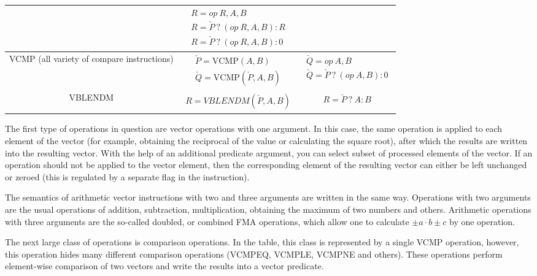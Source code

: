 \documentclass[
11pt,%
tightenlines,%
twoside,%
onecolumn,%
nofloats,%
nobibnotes,%
nofootinbib,%
superscriptaddress,%
noshowpacs,%
centertags]%
{revtex4}
\begin{document}
\begin{table}[!h]
\begin{tabular}{|c|c|c|}
& $\begin{matrix} R = op \ R, A, B \\ R = \check{P} \ ? \ (op \ R, A, B) : R \\ R = \check{P} \ ? \ (op \ R, A, B) : 0 \end{matrix}$ \\
\hline
\parbox{7.5cm}{VCMP (all variety of compare instructions)}
& $\begin{matrix} \check{P} = \text{VCMP}(A, B) \\ \check{Q} = \text{VCMP}(\check{P}, A, B) \end{matrix}$
& $\begin{matrix} \check{Q} = op \ A, B \\ \check{Q} = \check{P} \ ? \ (op \ A, B) : 0 \end{matrix}$ \\
\hline
\parbox{7.5cm}{VBLENDM}
& $\begin{matrix} R = VBLENDM(\check{P}, A, B) \end{matrix}$
& $\begin{matrix} R = \check{P} \ ? \ A : B \end{matrix}$ \\
\hline
\end{tabular}
\label{tab:avx512instructions}
\end{table}   

The first type of operations in question are vector operations with one argument.
In this case, the same operation is applied to each element of the vector (for example, obtaining the reciprocal of the value or calculating the square root), after which the results are written into the resulting vector.
With the help of an additional predicate argument, you can select subset of processed elements of the vector.
If an operation should not be applied to the vector element, then the corresponding element of the resulting vector can either be left unchanged or zeroed (this is regulated by a separate flag in the instruction).

The semantics of arithmetic vector instructions with two and three arguments are written in the same way.
Operations with two arguments are the usual operations of addition, subtraction, multiplication, obtaining the maximum of two numbers and others.
Arithmetic operations with three arguments are the so-called doubled, or combined FMA operations, which allow one to calculate $\pm a \cdot b \pm c$ by one operation.

The next large class of operations is comparison operations.
In the table, this class is represented by a single VCMP operation, however, this operation hides many different comparison operations (VCMPEQ, VCMPLE, VCMPNE and others).
These operations perform element-wise comparison of two vectors and write the results into a vector predicate.
\end{document}
